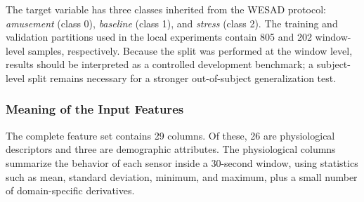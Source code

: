 \documentclass[12pt]{article}
\begin{document}
The target variable has three classes inherited from the WESAD protocol: \textit{amusement} (class 0), \textit{baseline} (class 1), and \textit{stress} (class 2). The training and validation partitions used in the local experiments contain 805 and 202 window-level samples, respectively. Because the split was performed at the window level, results should be interpreted as a controlled development benchmark; a subject-level split remains necessary for a stronger out-of-subject generalization test.

\subsubsection{Meaning of the Input Features}

The complete feature set contains 29 columns. Of these, 26 are physiological descriptors and three are demographic attributes. The physiological columns summarize the behavior of each sensor inside a 30-second window, using statistics such as mean, standard deviation, minimum, and maximum, plus a small number of domain-specific derivatives.

\begin{table}[htbp]
\centering
\caption{Feature groups used in the WESAD tabular training pipeline.}
\label{tab:wesad_features}
\end{table}
\end{document}
